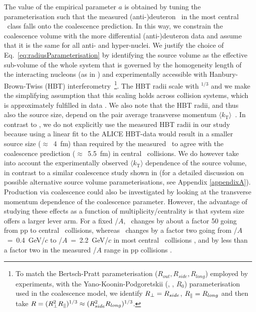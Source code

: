 \documentclass[%
 reprint,
 amsmath,amssymb,
 aps,
]{revtex4-1}
\begin{document}
The value of the empirical parameter $a$ is obtained by tuning the parameterisation such that the measured (anti-)deuteron \btwo~in the most central \PbPb~class falls onto the coalescence prediction. 
In this way, we constrain the coalescence volume with the more differential (anti-)deuteron data and assume that it is the same for all anti- and hyper-nuclei. 
We justify the choice of Eq.~\ref{eq:radiusParameterisation} by identifying the source volume as the effective sub-volume of the whole system that is governed by the homogeneity length of the interacting nucleons (as in \cite{Scheibl:1998tk}) and experimentally accessible with Hanbury-Brown-Twiss (HBT) interferometry~\footnote{To match the Bertsch-Pratt parameterisation ($R_{out}, R_{side}, R_{long}$) employed by experiments, with the Yano-Koonin-Podgoretskii (\rperp, \rpar, $R_{0}$) parameterisation used in the coalescence model,  we identify $R_{\perp} = R_{side}$, $R_{\|} = R_{long}$ and then take $R = (R_{\perp}^{2}R_{\|})^{1/3} \approx (R_{side}^{2}R_{long})^{1/3}$.}.
The HBT radii scale with \avdNdeta$^{1/3}$ and we make the simplifying assumption that this scaling holds across collision systems, which is approximately fulfilled in data \cite{Adam:2015vna,Adam:2015pya}. 
We also note that the HBT radii, and thus also the source size, depend on the pair average transverse momentum $\langle k_{\mathrm{T}}\rangle$~\cite{Aamodt:2011mr}. 
In contrast to \cite{Blum:2017qnn}, we do not explicitly use the measured HBT radii in our study because using a linear fit to the ALICE HBT-data \cite{Abelev:2012sq,Adam:2015vna} would result in a smaller source size ($\approx$~4~fm) than required by the measured \btwo~to agree with the coalescence prediction ($\approx$~5.5~fm) in central \PbPb~collisions.
We do however take into account the experimentally observed $\langle k_{\mathrm{T}}\rangle$ dependence of the source volume, in contrast to a similar coalescence study shown in \cite{Sun:2018mqq} (for a detailed discussion on possible alternative source volume parameterisations, see Appendix \ref{appendixA}). 
%
Production via coalescence could also be investigated by looking at the transverse momentum dependence of the coalescence parameter. However, 
the advantage of studying these effects as a function of multiplicity/centrality is that system size offers a larger lever arm. 
For a fixed \pt/$A$, \btwo~changes by about a factor 50 going from pp to central \PbPb~collisions, whereas \btwo~changes by a factor two going from \pt/$A$~=~0.4~GeV/$c$ to \pt/$A$~=~2.2~GeV/$c$  in most central \PbPb~collisions \cite{ALICE:deuteronppPbPb2015}, and by less than a factor two in the measured \pt/$A$ range in pp collisions \cite{ALICE:nucleipp2017, Acharya:2019rgc}.
\end{document}
